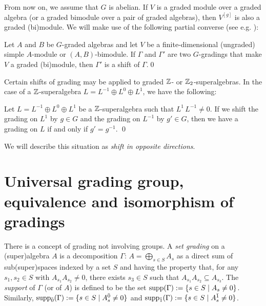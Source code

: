 From now on, we assume that $G$ is abelian.
If $V$ is a graded module over a graded algebra (or a graded bimodule over a pair of graded algebras), then $V^{[g]}$ is also a graded (bi)module. 
We will make use of the following partial converse (see e.g. \cite[Proposition 3.5]{paper-Qn}):

\begin{lemma}\label{lemma:simplebimodule}
	Let $A$ and $B$ be $G$-graded algebras and let $V$ be a finite-dimensional (ungraded) simple $A$-module or $(A,B)$-bimodule.  If $\Gamma$ and $\Gamma'$ are  two $G$-gradings that make $V$ a graded (bi)module, then $\Gamma'$ is a  shift of $\Gamma$.\qed
\end{lemma}

Certain shifts of grading may be applied to graded $\mathbb{Z}$- or $\mathbb{Z}_2$-superalgebras. In the case of a $\mathbb{Z}$-superalgebra $L=L^{-1}\oplus L^{0}\oplus L^{1}$, we have the following:

\begin{lemma}\label{lemma:opposite-directions}
	Let $L=L^{-1}\oplus L^0\oplus L^1$ be a $\mathbb{Z}$-superalgebra such that $L^1\, L^{-1}\neq 0$. If we shift the grading on $L^1$ by $g\in G$ and the grading on $L^{-1}$ by $g' \in G$, then we have a grading on $L$ if and only if $g' = g^{-1}$. \qed
\end{lemma}

We will describe this situation as \emph{shift in opposite directions}.

\section{Universal grading group, equivalence and isomorphism of gradings}\label{ssec:universal_group}

There is a concept of grading not involving groups. A \emph{set grading} on a (super)algebra $A$ is a decomposition $\Gamma:\,A=\bigoplus_{s\in S}A_s$ as a direct sum of sub\-(su\-per)\-spa\-ces indexed by a set $S$ and having the property that, for any $s_1,s_2\in S$ with $A_{s_1}A_{s_2}\ne 0$, there exists $s_3\in S$ such that $A_{s_1}A_{s_2}\subseteq A_{s_3}$. The \emph{support} of $\Gamma$ (or of $A$) is defined to be the set $\operatorname{supp}(\Gamma) := \{s\in S \mid A_s \neq 0\}$.
Similarly, $\operatorname{supp}_{\bar{0}}(\Gamma) := \{s\in S \mid A_s^{\bar{0}} \neq 0\}$ and $\operatorname{supp}_{\bar{1}}(\Gamma) := \{s\in S \mid A_s^{\bar{1}} \neq 0\}$.

